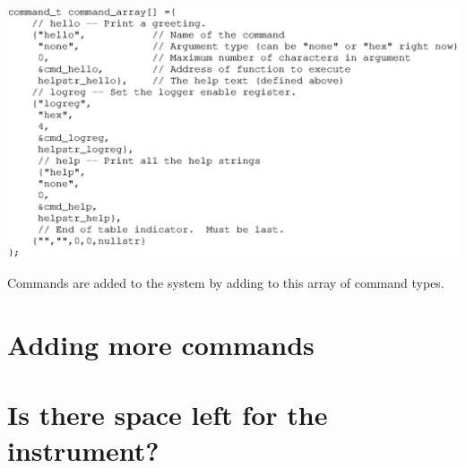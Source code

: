 \begin{listing}[ht]
    \begin{center}
        \includegraphics[clip,scale=0.75]{command_array}
        \caption{Commands are added to the system by adding to this array of command types.\label{lst:cmdarray}}
    \end{center}
\end{listing}

\clearpage{}
\section{Adding more commands}

\clearpage{}
\section{Is there space left for the instrument?}






\clearpage{}
\raggedright


